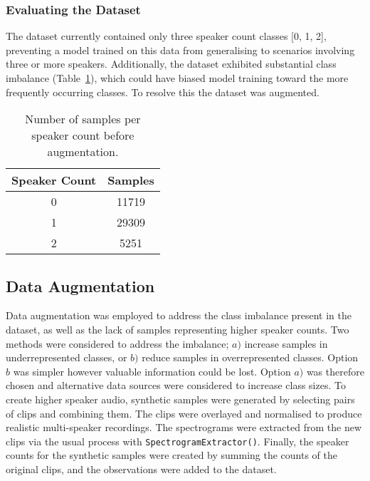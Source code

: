 \subsubsection{Evaluating the Dataset}
The dataset currently contained only three speaker count classes [0, 1, 2], preventing a model trained on this data from generalising to scenarios involving three or more speakers. Additionally, the dataset exhibited substantial class imbalance (Table~\ref{tab:samples_pre_aug}), which could have biased model training toward the more frequently occurring classes. To resolve this the dataset was augmented.

\begin{table}[H]
  \centering
  \caption{Number of samples per speaker count before augmentation.}
  \label{tab:samples_pre_aug}
  \begin{tabular}{|c|c|}
    \hline
    \textbf{Speaker Count} & \textbf{Samples} \\
    \hline
    0 & 11719 \\
    \hline
    1 & 29309 \\
    \hline
    2 & 5251 \\
    \hline
  \end{tabular}
\end{table}

\subsection{Data Augmentation}
Data augmentation was employed to address the class imbalance present in the dataset, as well as the lack of samples representing higher speaker counts. Two methods were considered to address the imbalance; $a)$ increase samples in underrepresented classes, or $b)$ reduce samples in overrepresented classes. Option $b$ was simpler however valuable information could be lost. Option $a)$ was therefore chosen and alternative data sources were considered to increase class sizes. To create higher speaker audio, synthetic samples were generated by selecting pairs of clips and combining them. The clips were overlayed and normalised to produce realistic multi-speaker recordings. The spectrograms were extracted from the new clips via the usual process with \lstinline!SpectrogramExtractor()!. Finally, the speaker counts for the synthetic samples were created by summing the counts of the original clips, and the observations were added to the dataset.\newline

